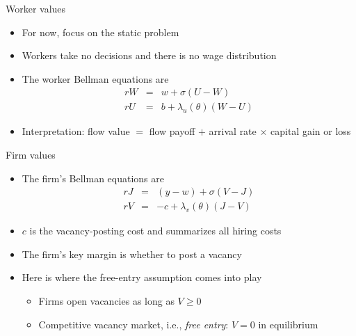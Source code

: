 \documentclass[9pt]{beamer}
\newcommand{\bit}{\begin{itemize}}
\newcommand{\eit}{\end{itemize}}
\begin{document}
\begin{frame}{Worker values}

\bit
\setlength\itemsep{2em}

\item For now, focus on the static problem

\item Workers take no decisions and there is no wage distribution

\item The worker Bellman equations are
\begin{eqnarray}
rW &=& w  + \sigma \left(U-W \right) \nonumber \\ 
rU &=& b  + \lambda_u(\theta) \left(W-U\right) \nonumber
\end{eqnarray}

\item Interpretation: flow value $=$ flow payoff $+$ arrival rate $\times$ capital gain or loss


\eit
\end{frame}

\begin{frame}{Firm values}

\bit
\setlength\itemsep{2em}

\item The firm's Bellman equations are
\begin{eqnarray}
rJ &=& (y-w)  + \sigma \left(V-J\right) \nonumber \\ 
rV &=& -c  + \lambda_v(\theta) \left(J-V\right) \nonumber
\end{eqnarray}

\item $c$ is the vacancy-posting cost and summarizes all hiring costs

\item The firm's key margin is whether to post a vacancy

\item Here is where the free-entry assumption comes into play
\bit
\setlength\itemsep{0.5em}
\item Firms open vacancies as long as $V \geq 0$
\item Competitive vacancy market, i.e., \emph{free entry}: $V=0$ in equilibrium
\eit

\eit
\end{frame}
\end{document}
